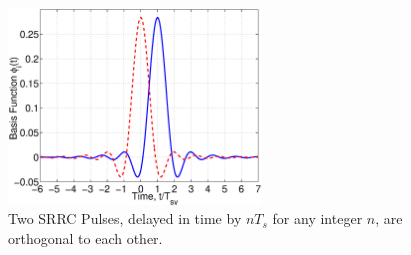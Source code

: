 \begin{figure}[htbp]
  \centerline{\includegraphics[width=0.6\textwidth]{../images/plotTwoTimeDelayedSRRCPulses.eps}}
  \caption{Two SRRC Pulses, delayed in time by $nT_{s}$ for any integer $n$, are orthogonal to each other.}
  \label{F:plotTwoTimeDelayedSRRCPulses}
\end{figure}

